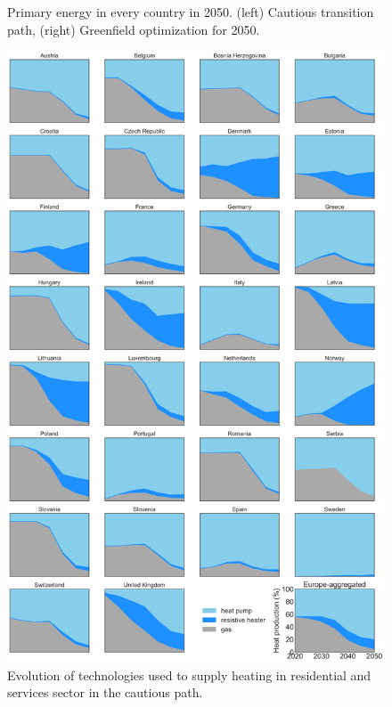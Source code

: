 \documentclass[3p]{elsarticle} %
\begin{document}
\begin{figure}[!h]
\centering
\caption{Primary energy in every country in 2050. (left) Cautious transition path, (right) Greenfield optimization for 2050.} \label{fig_spatial_plot} 
\end{figure}

\begin{figure}[!h]
\centering
\includegraphics[width=14cm]{figures/heat_production_go.png}
\caption{Evolution of technologies used to supply heating in residential and services sector in the cautious path. } \label{fig_heating_shares} 
\end{figure}
\end{document}
